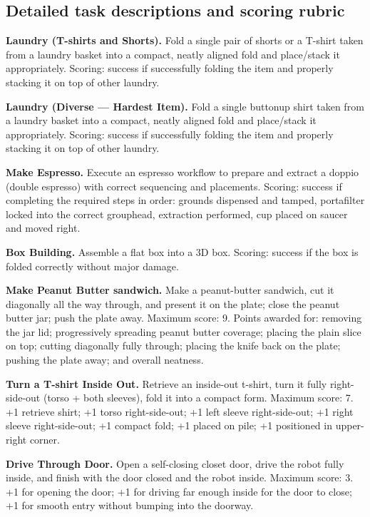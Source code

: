 \documentclass[conference]{IEEEtran}
\begin{document}
\subsection{Detailed task descriptions and scoring rubric}
\label{app:tasks}

\noindent \textbf{Laundry (T-shirts and Shorts).} Fold a single pair of shorts or a T-shirt taken from a laundry basket into a compact, neatly aligned fold and place/stack it appropriately.
Scoring: success if successfully folding the item and properly stacking it on top of other laundry.

\noindent \textbf{Laundry (Diverse --- Hardest Item).} Fold a single buttonup shirt taken from a laundry basket into a compact, neatly aligned fold and place/stack it appropriately. Scoring: success if successfully folding the item and properly stacking it on top of other laundry.

\noindent \textbf{Make Espresso.} Execute an espresso workflow to prepare and extract a doppio (double espresso) with correct sequencing and placements.
Scoring: success if completing the required steps in order: grounds dispensed and tamped, portafilter locked into the correct grouphead, extraction performed, cup placed on saucer and moved right.

\noindent \textbf{Box Building.} Assemble a flat box into a 3D box. Scoring: success if the box is folded correctly without major damage.

\noindent \textbf{Make Peanut Butter sandwich.} Make a peanut-butter sandwich, cut it diagonally all the way through, and present it on the plate; close the peanut butter jar; push the plate away.
Maximum score: 9. Points awarded for: removing the jar lid; progressively spreading peanut butter coverage; placing the plain slice on top; cutting diagonally fully through; placing the knife back on the plate; pushing the plate away; and overall neatness.

\noindent \textbf{Turn a T-shirt Inside Out.} Retrieve an inside-out t-shirt, turn it fully right-side-out (torso + both sleeves), fold it into a compact form.
Maximum score: 7. +1 retrieve shirt; +1 torso right-side-out; +1 left sleeve right-side-out; +1 right sleeve right-side-out; +1 compact fold; +1 placed on pile; +1 positioned in upper-right corner.

\noindent \textbf{Drive Through Door.} Open a self-closing closet door, drive the robot fully inside, and finish with the door closed and the robot inside.
Maximum score: 3. +1 for opening the door; +1 for driving far enough inside for the door to close; +1 for smooth entry without bumping into the doorway.
\end{document}
